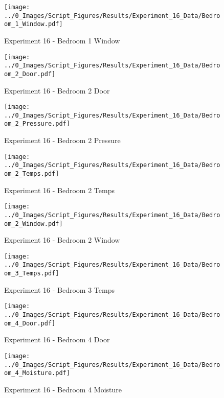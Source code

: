 	\clearpage

	\begin{figure}[H]
		\centering
		\texttt{[image: ../0\_Images/Script\_Figures/Results/Experiment\_16\_Data/Bedroom\_1\_Window.pdf]}
		\caption[]{Experiment 16 - Bedroom 1 Window}
	\end{figure}
 

	\begin{figure}[H]
		\centering
		\texttt{[image: ../0\_Images/Script\_Figures/Results/Experiment\_16\_Data/Bedroom\_2\_Door.pdf]}
		\caption[]{Experiment 16 - Bedroom 2 Door}
	\end{figure}
 
	\clearpage

	\begin{figure}[H]
		\centering
		\texttt{[image: ../0\_Images/Script\_Figures/Results/Experiment\_16\_Data/Bedroom\_2\_Pressure.pdf]}
		\caption[]{Experiment 16 - Bedroom 2 Pressure}
	\end{figure}
 

	\begin{figure}[H]
		\centering
		\texttt{[image: ../0\_Images/Script\_Figures/Results/Experiment\_16\_Data/Bedroom\_2\_Temps.pdf]}
		\caption[]{Experiment 16 - Bedroom 2 Temps}
	\end{figure}
 
	\clearpage

	\begin{figure}[H]
		\centering
		\texttt{[image: ../0\_Images/Script\_Figures/Results/Experiment\_16\_Data/Bedroom\_2\_Window.pdf]}
		\caption[]{Experiment 16 - Bedroom 2 Window}
	\end{figure}
 

	\begin{figure}[H]
		\centering
		\texttt{[image: ../0\_Images/Script\_Figures/Results/Experiment\_16\_Data/Bedroom\_3\_Temps.pdf]}
		\caption[]{Experiment 16 - Bedroom 3 Temps}
	\end{figure}
 
	\clearpage

	\begin{figure}[H]
		\centering
		\texttt{[image: ../0\_Images/Script\_Figures/Results/Experiment\_16\_Data/Bedroom\_4\_Door.pdf]}
		\caption[]{Experiment 16 - Bedroom 4 Door}
	\end{figure}
 

	\begin{figure}[H]
		\centering
		\texttt{[image: ../0\_Images/Script\_Figures/Results/Experiment\_16\_Data/Bedroom\_4\_Moisture.pdf]}
		\caption[]{Experiment 16 - Bedroom 4 Moisture}
	\end{figure}
 
